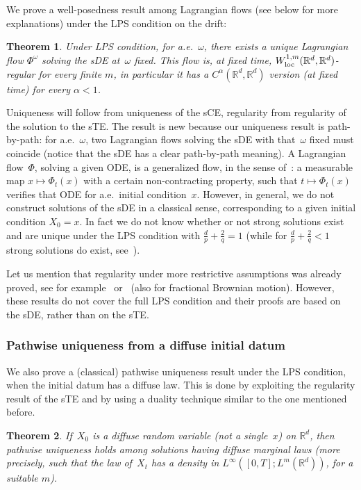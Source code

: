 \documentclass[a4paper,10pt]{article}
\newtheorem{theorem}{Theorem}[section]
\newcommand\1{\mathbbm{1}}
\newcommand{\mr}{\mathbb{R}}
\newcommand\loc{{\rm loc}}
\numberwithin{equation}{section}
\begin{document}
We prove a well-posedness result among Lagrangian flows (see below for more explanations) under the LPS condition on the drift:

\begin{theorem}
Under LPS condition, for a.e.~$\omega$, there exists a unique Lagrangian flow $\Phi^\omega$ solving the sDE at~$\omega$ fixed. This flow is, at fixed time, $W_{\loc}^{1,m}(\mathbb{R}^{d},\mathbb{R}^{d})$-regular for every finite $m$, in particular it has a $C^\alpha(\mathbb{R}^{d},\mathbb{R}^{d})$ version \textup{(}at fixed time\textup{)} for every $\alpha<1$.
\end{theorem}

Uniqueness will follow from uniqueness of the sCE, regularity from regularity of the solution to the sTE. The result is new because our uniqueness result is path-by-path: for a.e.~$\omega$, two Lagrangian flows solving the sDE with that~$\omega$ fixed must coincide (notice that the sDE has a clear path-by-path meaning). A Lagrangian flow~$\Phi$, solving a given ODE, is a generalized flow, in the sense of~\cite{DIPELI89,AMBROSIO04}: a measurable map $x\mapsto\Phi_{t}(x)$ with a certain non-contracting property, such that $t\mapsto\Phi_{t}(x)$ verifies that ODE for a.e.~initial condition~$x$. However, in general, we do not construct solutions of the sDE in a classical sense, corresponding to a given initial condition $X_{0}=x$. In fact we do not know whether or not strong solutions exist and are unique under the LPS condition with $\frac{d}{p}+\frac{2}{q}=1$ (while for $\frac {d}{p}+\frac{2}{q}<1$ strong solutions do exist, see~\cite{KRYROE05}).

Let us mention that regularity under more restrictive assumptions was already proved, see for example~\cite{FedFla13,MoPrTh} or~\cite{CATGUB13} (also for fractional Brownian motion). However, these results do not cover the full LPS condition and their proofs are based on the sDE, rather than on the sTE.

\subsubsection{Pathwise uniqueness from a diffuse initial datum}

We also prove a (classical) pathwise uniqueness result under the LPS condition, when the initial datum has a diffuse law. This is done by exploiting the regularity result of the sTE and by using a duality technique similar to the one mentioned before.

\begin{theorem}
If~$X_0$ is a diffuse random variable \textup{(}not a single~$x$\textup{)} on $\mr^d$, then pathwise uniqueness holds among solutions having diffuse marginal laws \textup{(}more precisely, such that the law of~$X_t$ has a density in $L^\infty([0,T];L^m(\mr^d))$, for a suitable $m$\textup{)}.\end{theorem}
\end{document}
